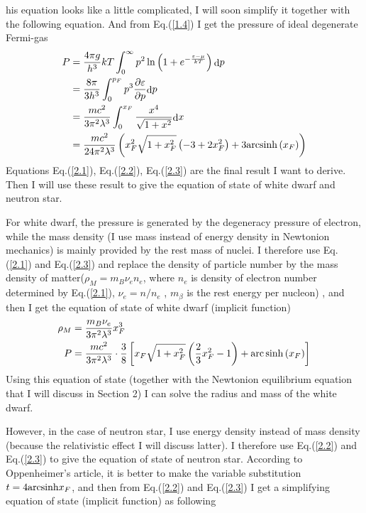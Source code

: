 \documentclass[preprint]{revtex4-1}
\begin{document}
his equation looks like a little complicated, I will soon simplify it together with the following equation. And from Eq.(\ref{1.4}) I get the pressure of ideal degenerate Fermi-gas
\begin{align}
	 P &= {{4\pi g} \over {{h^3}}}kT\int_0^\infty  {{p^2}\ln \left( {1 + {e^{ - {{\varepsilon  - \mu } \over {kT}}}}} \right){\mathop{\rm d}\nolimits} p}  \nonumber \\ 
	& = {{8\pi } \over {3{h^3}}}\int_0^{{p_F}} {{p^3}{{\partial \varepsilon } \over {\partial p}}{\mathop{\rm d}\nolimits} p}    
	 {\rm{       }} \nonumber \\ 
	& = {{m{c^2}} \over {3{\pi ^2}{\lambda ^3}}}\int_0^{{x_F}} {{{{x^4}} \over {\sqrt {1 + {x^2}} }}} {\mathop{\rm d}\nolimits} x \nonumber \\ 
	& = {{m{c^2}} \over {24{\pi ^2}{\lambda ^3}}}\left( {x_F^2\sqrt {1 + x_F^2} \left( { - 3 + 2x_F^2} \right) + 3{\mathop{\rm arcsinh}\nolimits} \left( {{x_F}} \right)} \right)  \label{2.3}
\end{align}
Equations Eq.(\ref{2.1}), Eq.(\ref{2.2}), Eq.(\ref{2.3}) are the final result I want to derive. Then I will use these result to give the equation of state of white dwarf and neutron star.\par
For white dwarf, the pressure is generated by the degeneracy pressure of electron, while the mass density (I use mass instead of energy density in Newtonion mechanics) is mainly provided by the rest mass of nuclei. I therefore use Eq.(\ref{2.1})  and Eq.(\ref{2.3}) and replace the density of particle number by the mass density of matter(${\rho _M} = {m_B}{\nu _e}{n_e}$, where $n_e$ is density of electron number determined by Eq.(\ref{2.1}), ${\nu _e} = n/{n_e}$ , $m_\beta$   is the rest energy per nucleon)
, and then I get the equation of state of white dwarf (implicit function)
\begin{align}
{\rho _M} &= {{{m_B}{\nu _e}} \over {3{\pi ^2}{\lambda ^3}}}x_F^3 \nonumber \\
P &= {{m{c^2}} \over {3{\pi ^2}{\lambda ^3}}} \cdot {3 \over 8}\left[ {{x_F}\sqrt {1 + x_F^2} \left( {{2 \over 3}x_F^2 - 1} \right) + {\mathop{\rm arc}\nolimits} \sinh \left( {{x_F}} \right)} \right] \label{2.4}
\end{align}
Using this equation of state (together with the Newtonion equilibrium equation that I will discuss in Section 2) I can solve the radius and mass of the white dwarf.\par
However, in the case of neutron star, I use energy density instead of mass density (because the relativistic effect I will discuss latter). I therefore use Eq.(\ref{2.2}) and Eq.(\ref{2.3}) to give the equation of state of neutron star. According to Oppenheimer’s article, it is better to make the variable substitution $t = 4{\mathop{\rm arcsinh}\nolimits} {x_F}$, and then from Eq.(\ref{2.2}) and Eq.(\ref{2.3}) I get a simplifying equation of state (implicit function) as following
\end{document}
